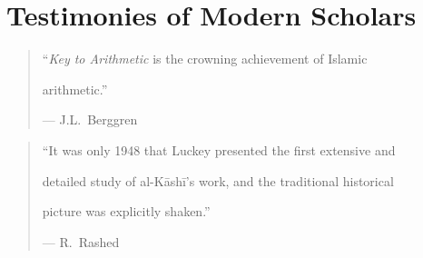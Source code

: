 \documentclass[11pt,a4paper]{article}
\begin{document}
\clearpage






\section{Testimonies of Modern Scholars}

\label{app:scholars}



\begin{quote}

``\textit{Key to Arithmetic} is the crowning achievement of Islamic

arithmetic.''

\begin{flushright}

--- J.L.\ Berggren

\end{flushright}

\end{quote}



\vspace{0.3cm}



\begin{quote}

``It was only 1948 that Luckey presented the first extensive and

detailed study of al-K\=ash\=i's work, and the traditional historical

picture was explicitly shaken.''

\begin{flushright}

--- R.\ Rashed

\end{flushright}

\end{quote}



\vspace{0.3cm}
\end{document}

